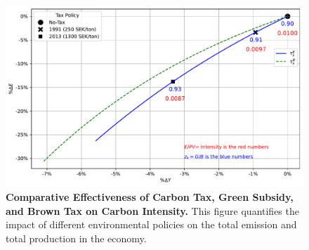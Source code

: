\documentclass[11pt]{article}
\begin{document}
\vfill
\begin{figure}[!htb]
\centerline{\includegraphics[width=7in]{Figures/emission_production.pdf}}
\caption{{\bf Comparative Effectiveness of Carbon Tax, Green Subsidy, and Brown Tax on Carbon Intensity.} This figure quantifies the impact of different environmental policies on the total emission and total production in the economy.} \label{fig:emission_production}
\end{figure}
\vfill
\end{document}

